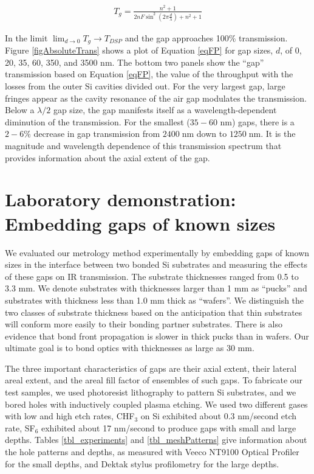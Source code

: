 \documentclass[osajnl,preprint,showpacs,superscriptaddress,12pt]{revtex4-1} %
\begin{document}
\begin{eqnarray}
T_{g} = \frac{n^2+1}{2 n F \sin ^2(2\pi \frac{d}{\lambda})+n^2+1} \label{eqFP}
\end{eqnarray}

In the limit $\lim_{d \to 0} T_g \rightarrow T_{DSP} $ and the gap approaches 100\% transmission.  Figure \ref{figAbsoluteTrans} shows a plot of Equation \ref{eqFP} for gap sizes, $d$, of 0, 20, 35, 60, 350, and 3500 nm.  The bottom two panels show the ``gap'' transmission based on Equation \ref{eqFP}, the value of the throughput with the losses from the outer Si cavities divided out.  For the very largest gap, large fringes appear as the cavity resonance of the air gap modulates the transmission.  Below a $\lambda/2$ gap size, the gap manifests itself as a wavelength-dependent diminution of the transmission.  For the smallest ($35-60$ nm) gaps, there is a $2-6\%$ decrease in gap transmission from $2400\;$nm down to $1250\;$nm.  It is the magnitude and wavelength dependence of this transmission spectrum that provides information about the axial extent of the gap.

\section{Laboratory demonstration: Embedding gaps of known sizes}

We evaluated our metrology method experimentally by embedding gaps of known sizes in the interface between two bonded Si substrates and measuring the effects of these gaps on IR transmission.  The substrate thicknesses ranged from 0.5 to 3.3 mm.  We denote substrates with thicknesses larger than 1 mm as ``pucks'' and substrates with thickness less than 1.0 mm thick as ``wafers''.  We distinguish the two classes of substrate thickness based on the anticipation that thin substrates will conform more easily to their bonding partner substrates.  There is also evidence that bond front propagation is slower in thick pucks \cite{2007ApOpt..46.6793H} than in wafers.  Our ultimate goal is to bond optics with thicknesses as large as 30 mm.

The three important characteristics of gaps are their axial extent, their lateral areal extent, and the areal fill factor of ensembles of such gaps.  To fabricate our test samples, we used photoresist lithography to pattern Si substrates, and we bored holes with inductively coupled plasma etching.  We used two different gases with low and high etch rates, CHF$_3$ on Si exhibited about 0.3 nm/second etch rate, SF$_6$ exhibited about 17 nm/second to produce gaps with small and large depths.  Tables \ref{tbl_experiments} and \ref{tbl_meshPatterns} give information about the hole patterns and depths, as measured with Veeco NT9100 Optical Profiler for the small depths, and Dektak stylus profilometry for the large depths.
\end{document}
